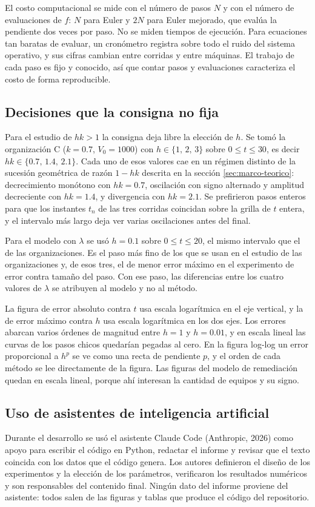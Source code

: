 El costo computacional se mide con el número de pasos $N$ y con el número de evaluaciones de
$f$: $N$ para Euler y $2N$ para Euler mejorado, que evalúa la pendiente dos veces por paso. No se
miden tiempos de ejecución. Para ecuaciones tan baratas de evaluar, un cronómetro registra sobre
todo el ruido del sistema operativo, y sus cifras cambian entre corridas y entre máquinas. El
trabajo de cada paso es fijo y conocido, así que contar pasos y evaluaciones caracteriza el
costo de forma reproducible.

\subsection{Decisiones que la consigna no fija}
\label{subsec:parametros}

Para el estudio de $hk > 1$ la consigna deja libre la elección de $h$. Se tomó la organización C
($k = 0.7$, $V_0 = 1000$) con $h \in \{1,\, 2,\, 3\}$ sobre $0 \le t \le 30$, es decir
$hk \in \{0.7,\, 1.4,\, 2.1\}$. Cada uno de esos valores cae en un régimen distinto de la
sucesión geométrica de razón $1 - hk$ descrita en la sección \ref{sec:marco-teorico}:
decrecimiento monótono con $hk = 0.7$, oscilación con signo alternado y amplitud decreciente con
$hk = 1.4$, y divergencia con $hk = 2.1$. Se prefirieron pasos enteros para que los instantes
$t_n$ de las tres corridas coincidan sobre la grilla de $t$ entera, y el intervalo más largo deja
ver varias oscilaciones antes del final.

Para el modelo con $\lambda$ se usó $h = 0.1$ sobre $0 \le t \le 20$, el mismo intervalo que el
de las organizaciones. Es el paso más fino de los que se usan en el estudio de las organizaciones
y, de esos tres, el de menor error máximo en el experimento de error contra tamaño del paso. Con
ese paso, las diferencias entre los cuatro valores de $\lambda$ se atribuyen al modelo y no al
método.

La figura de error absoluto contra $t$ usa escala logarítmica en el eje vertical, y la de error
máximo contra $h$ usa escala logarítmica en los dos ejes. Los errores abarcan varios órdenes de
magnitud entre $h = 1$ y $h = 0.01$, y en escala lineal las curvas de los pasos chicos quedarían
pegadas al cero. En la figura log-log un error proporcional a $h^{p}$ se ve como una recta de
pendiente $p$, y el orden de cada método se lee directamente de la figura. Las figuras del
modelo de remediación quedan en escala lineal, porque ahí interesan la cantidad de equipos y su
signo.

\subsection{Uso de asistentes de inteligencia artificial}
\label{subsec:ia}

Durante el desarrollo se usó el asistente Claude Code (Anthropic, 2026) como apoyo para escribir
el código en Python, redactar el informe y revisar que el texto coincida con los datos que el
código genera. Los autores definieron el diseño de los experimentos y la elección de los
parámetros, verificaron los resultados numéricos y son responsables del contenido final. Ningún
dato del informe proviene del asistente: todos salen de las figuras y tablas que produce el
código del repositorio.

